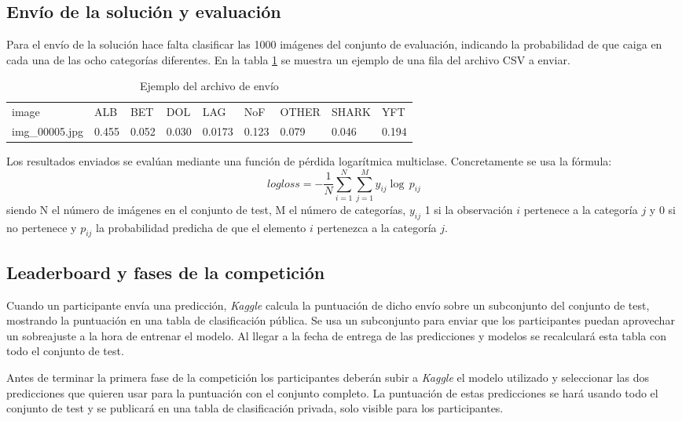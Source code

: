 \subsection{Envío de la solución y evaluación}
\label{sec:envio-y-eval}

Para el envío de la solución hace falta clasificar las 1000 imágenes del conjunto de evaluación, indicando la probabilidad de que caiga en cada una de las ocho categorías diferentes. En la tabla \ref{submission-sample} se muestra un ejemplo de una fila del archivo CSV a enviar.

\begin{table}[]
\centering
\caption{Ejemplo del archivo de envío}
\label{submission-sample}
\begin{tabular}{lllllllll}
image          & ALB   & BET   & DOL   & LAG    & NoF   & OTHER & SHARK  & YFT  \\
img\_00005.jpg & 0.455 & 0.052 & 0.030 & 0.0173 & 0.123 & 0.079 & 0.046 & 0.194\\
\end{tabular}
\end{table}

Los resultados enviados se evalúan mediante una función de pérdida logarítmica multiclase. Concretamente se usa la fórmula:
\[
  logloss =
  - \frac{1}{N} \sum_{i=1}^N \sum_{j=1}^M y_{ij} \log \, p_{ij}
\]
 siendo N el número de imágenes en el conjunto de test, M el número de
 categorías, $y_{ij}$ 1 si la observación $i$ pertenece a la categoría $j$ y 0 si no
 pertenece y $p_{ij}$ la probabilidad predicha de que el elemento $i$ pertenezca
 a la categoría $j$.

 \subsection{Leaderboard y fases de la competición}

Cuando un participante envía una predicción, \textit{Kaggle }calcula la puntuación de dicho envío sobre un subconjunto del conjunto de test, mostrando la puntuación en una tabla de clasificación pública. Se usa un subconjunto para enviar que los participantes puedan aprovechar un sobreajuste a la hora de entrenar el modelo. Al llegar a la fecha de entrega de las predicciones y modelos se recalculará esta tabla con todo el conjunto de test.

Antes de terminar la primera fase de la competición los participantes deberán subir a \textit{Kaggle} el modelo utilizado y seleccionar las dos predicciones que quieren usar para la puntuación con el conjunto completo. La puntuación de estas predicciones se hará usando todo el conjunto de test y se publicará en una tabla de clasificación privada, solo visible para los participantes. 

